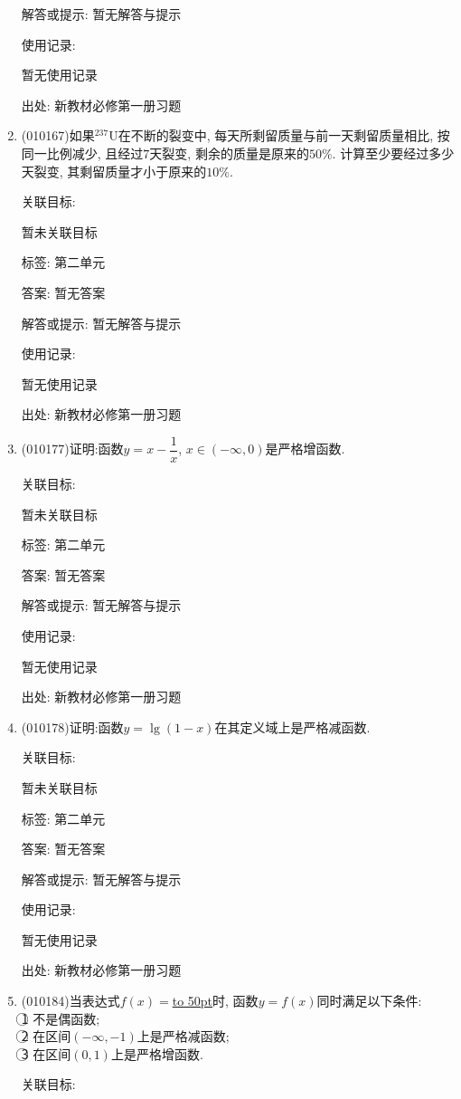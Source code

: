 \documentclass[10pt,a4paper]{article}
\newcommand{\blank}[1]{\underline{\hbox to #1pt{}}}
\begin{document}
\begin{enumerate}[1.]
解答或提示: 暂无解答与提示

使用记录:

暂无使用记录


出处: 新教材必修第一册习题
\item { (010167)}如果$^{237}\text{U}$在不断的裂变中, 每天所剩留质量与前一天剩留质量相比, 按同一比例减少, 且经过$7$天裂变, 剩余的质量是原来的$50\%$. 计算至少要经过多少天裂变, 其剩留质量才小于原来的$10\%$.


关联目标:

暂未关联目标



标签: 第二单元

答案: 暂无答案

解答或提示: 暂无解答与提示

使用记录:

暂无使用记录


出处: 新教材必修第一册习题
\item { (010177)}证明:函数$y=x-\dfrac 1x$, $x\in (-\infty, 0)$是严格增函数.


关联目标:

暂未关联目标



标签: 第二单元

答案: 暂无答案

解答或提示: 暂无解答与提示

使用记录:

暂无使用记录


出处: 新教材必修第一册习题
\item { (010178)}证明:函数$y=\lg (1-x)$在其定义域上是严格减函数.


关联目标:

暂未关联目标



标签: 第二单元

答案: 暂无答案

解答或提示: 暂无解答与提示

使用记录:

暂无使用记录


出处: 新教材必修第一册习题
\item { (010184)}当表达式$f(x)=$\blank{50}时, 函数$y=f(x)$同时满足以下条件:\\
\textcircled{1} 不是偶函数;\\
\textcircled{2} 在区间$(-\infty, -1)$上是严格减函数;\\
\textcircled{3} 在区间$(0, 1)$上是严格增函数.


关联目标:


\end{enumerate}
\end{document}
